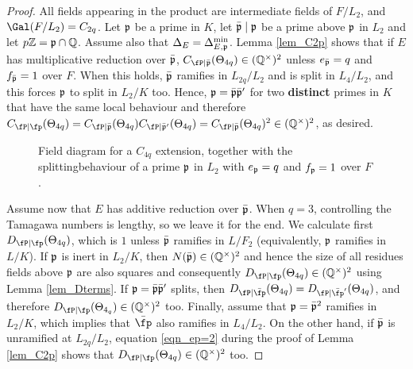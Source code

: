 \begin{proof}
    All fields appearing in the product are intermediate fields of $F/L_2$, and $\Gal(F/L_2)=C_{2q}$. Let $\mathfrak{p}$ be a prime in $K$, let $\bar{\mathfrak{p}}\mid\mathfrak{p}$ be a prime above $\mathfrak{p}$ in $L_2$ and let $p\mathbb{Z}=\mathfrak{p}\cap\mathbb{Q}$. Assume also that $\Delta_E=\Delta_{E,\mathfrak{p}}^{\min}$. Lemma \ref{lem_C2p} shows that if $E$ has multiplicative reduction over $\bar{\mathfrak{p}}$, $C_{\fP\mid\bar\pp}(\Theta_{4q})\in\QQss$ unless $e_{\bar{\mathfrak{p}}}=q$ and $f_{\bar{\mathfrak{p}}}=1$ over $F$. When this holds, $\bar{\mathfrak{p}}$ ramifies in $L_{2q}/L_2$ and is split in $L_4/L_2$, and this forces $\mathfrak{p}$ to split in $L_2/K$ too. Hence, $\mathfrak{p}=\bar{\mathfrak{p}}\bar{\mathfrak{p}}'$ for two \textbf{distinct} primes in $K$ that have the same local behaviour and therefore $\Cp(\Theta_{4q})=C_{\fP\mid\bar\pp}(\Theta_{4q})C_{\fP\mid\bar\pp'}(\Theta_{4q})=C_{\fP\mid\bar\pp}(\Theta_{4q})^2\in\QQss$, as desired.

    \begin{figure}[!ht]
        \centering
        \caption[short]{\centering Field diagram for a $C_{4q}$ extension, together with the splitting\newline behaviour of a prime $\mathfrak{p}$ in $L_2$ with $e_{\mathfrak{p}}=q$ and $f_{\mathfrak{p}}=1$ over $F$.}
    \end{figure}

    Assume now that $E$ has additive reduction over $\bar{\mathfrak{p}}$. When $q=3$, controlling the Tamagawa numbers is lengthy, so we leave it for the end. We calculate first $\Dp(\Theta_{4q})$, which is $1$ unless $\bar{\mathfrak{p}}$ ramifies in $L/F_2$ (equivalently, $\mathfrak{p}$ ramifies in $L/K$). If $\mathfrak{p}$ is inert in $L_2/K$, then $N(\bar{\mathfrak{p}})\in(\mathbb{Q}^{\times})^2$ and hence the size of all residues fields above $\mathfrak{p}$ are also squares and consequently $\Dp(\Theta_{4q})\in\QQss$ using Lemma \ref{lem_Dterms}. If $\mathfrak{p}=\bar{\mathfrak{p}}\bar{\mathfrak{p}}'$ splits, then $D_{\fP\mid\bar\fp}(\Theta_{4q})=D_{\fP\mid\bar\fp'}(\Theta_{4q})$, and therefore $\Dp(\Theta_{4_q})\in\QQss$ too. Finally, assume that $\mathfrak{p}=\bar{\mathfrak{p}}^2$ ramifies in $L_2/K$, which implies that $\bar\fp$ also ramifies in $L_4/L_2$. On the other hand, if $\bar{\mathfrak{p}}$ is unramified at $L_{2q}/L_2$, equation \eqref{eqn_ep=2} during the proof of Lemma \ref{lem_C2p} shows that $\Dp(\Theta_{4q})\in\QQss$ too. 


\end{proof}
